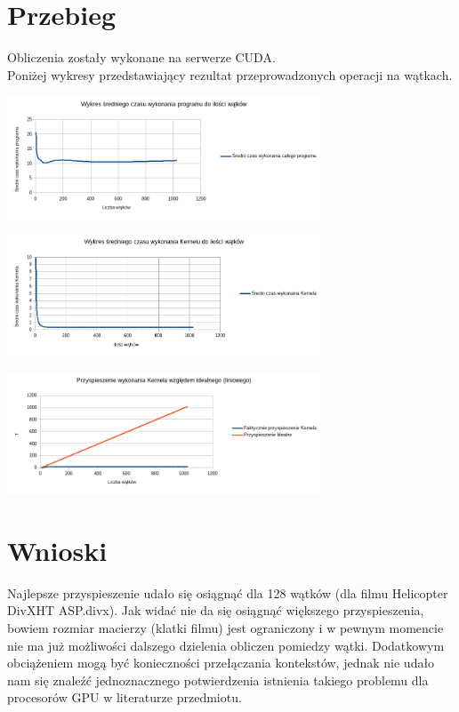 \documentclass[a4paper,12pt]{article}
\begin{document}
\section*{Przebieg}
Obliczenia zostały wykonane na serwerze CUDA. \\



Poniżej wykresy przedstawiający rezultat przeprowadzonych operacji na wątkach.
\\
\begin{center}
\includegraphics[width=0.7\textwidth]{data/wykonanieProgramu.png}
\end{center}

\begin{center}
\includegraphics[width=0.7\textwidth]{data/wykonanieKernela.png}
\end{center}


\begin{center}
\includegraphics[width=0.7\textwidth]{data/przyspieszenie.png}
\end{center}

\section*{Wnioski}
Najlepsze przyspieszenie udało się osiągnąć dla 128 wątków (dla filmu Helicopter DivXHT ASP.divx). Jak widać nie da się osiągnąć większego przyspieszenia, bowiem rozmiar macierzy (klatki filmu) jest ograniczony i w pewnym momencie nie ma już możliwości dalszego dzielenia obliczen pomiedzy wątki. Dodatkowym obciążeniem mogą  być konieczności przełączania kontekstów, jednak nie udało nam się znaleźć jednoznacznego potwierdzenia istnienia takiego problemu dla procesorów GPU w literaturze przedmiotu.
\end{document}
